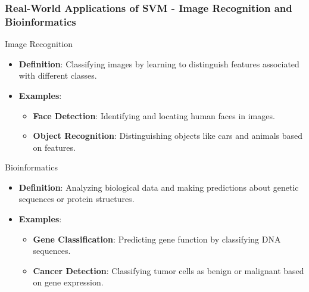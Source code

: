 \documentclass{beamer}
\begin{document}
\begin{frame}[fragile]
    \frametitle{Real-World Applications of SVM - Image Recognition and Bioinformatics}
    \begin{block}{Image Recognition}
        \begin{itemize}
            \item \textbf{Definition}: Classifying images by learning to distinguish features associated with different classes.
            \item \textbf{Examples}:
            \begin{itemize}
                \item \textbf{Face Detection}: Identifying and locating human faces in images.
                \item \textbf{Object Recognition}: Distinguishing objects like cars and animals based on features.
            \end{itemize}
        \end{itemize}
    \end{block}
    
    \begin{block}{Bioinformatics}
        \begin{itemize}
            \item \textbf{Definition}: Analyzing biological data and making predictions about genetic sequences or protein structures.
            \item \textbf{Examples}:
            \begin{itemize}
                \item \textbf{Gene Classification}: Predicting gene function by classifying DNA sequences.
                \item \textbf{Cancer Detection}: Classifying tumor cells as benign or malignant based on gene expression.
            \end{itemize}
        \end{itemize}
    \end{block}
\end{frame}
\end{document}
